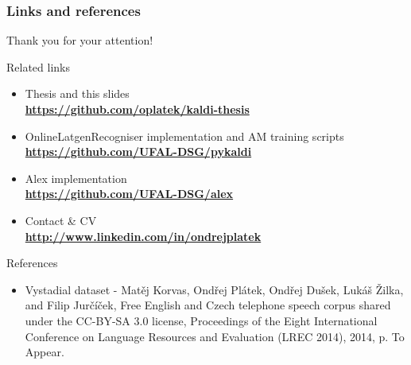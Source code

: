 \begin{frame}\frametitle{Links and references}
    Thank you for your attention! \\
    \begin{exampleblock}{Related links}
        \begin{itemize}
            \item Thesis and this slides \\ {\bf \url{https://github.com/oplatek/kaldi-thesis}}
            \item OnlineLatgenRecogniser implementation and AM training scripts \\ {\bf \url{https://github.com/UFAL-DSG/pykaldi}} 
            \item Alex implementation \\ {\bf \url{https://github.com/UFAL-DSG/alex}} 
            \item Contact \& CV \\ {\bf \url{http://www.linkedin.com/in/ondrejplatek}}
        \end{itemize}
    \end{exampleblock}
    \begin{exampleblock}{References}
        \begin{itemize}
            \item Vystadial dataset -  \tiny{Matěj Korvas, Ondřej Plátek, Ondřej Dušek, Lukáš Žilka, and Filip Jurčíček, Free English and Czech telephone speech corpus shared under the CC-BY-SA 3.0 license, Proceedings of the Eight International Conference on Language Resources and Evaluation (LREC 2014), 2014, p. To Appear.}
        \end{itemize}
    \end{exampleblock}
\end{frame}

